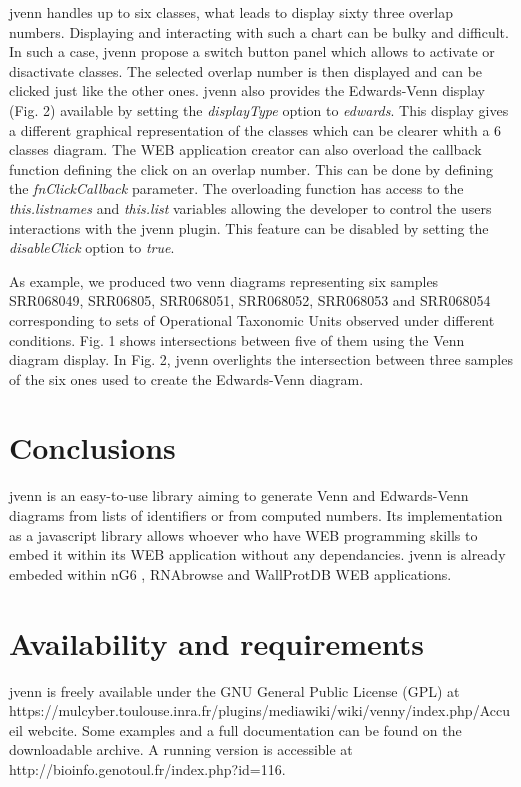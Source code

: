 \documentclass{bmcart}
\begin{document}
jvenn handles up to six classes, what leads to display sixty three overlap numbers. Displaying and interacting with such a chart
can be bulky and difficult. In such a case, jvenn propose a switch button panel which allows to activate or disactivate classes. 
The selected overlap number is then displayed and can be clicked just like the other ones. jvenn also provides the Edwards-Venn
display (Fig. 2) available by setting the \textit{displayType} option to \textit{edwards}. This display gives a different 
graphical representation of the classes which can be clearer whith a 6 classes diagram.
The WEB application creator can also overload the callback function defining the click on an overlap number. This can be done 
by defining the \textit{fnClickCallback} parameter. The overloading function has access to the \textit{this.listnames} and
\textit{this.list} variables allowing the developer to control the users interactions with the jvenn plugin. This feature can
be disabled by setting the \textit{disableClick} option to \textit{true}.

As example, we produced two venn diagrams representing six samples SRR068049, SRR06805, SRR068051, SRR068052, SRR068053 and 
SRR068054 corresponding to sets of Operational Taxonomic Units observed under different conditions. Fig. 1 shows intersections
between five of them using the Venn diagram display. In Fig. 2, jvenn overlights the intersection between three samples of the 
six ones used to create the Edwards-Venn diagram.


\section*{Conclusions}

jvenn is an easy-to-use library aiming to generate Venn and Edwards-Venn diagrams from lists of identifiers or from
computed numbers. Its implementation as a javascript library allows whoever who have WEB programming skills to embed 
it within its WEB application without any dependancies. jvenn is already embeded within nG6 \cite{Mariette2012}, 
RNAbrowse \cite{Mariette} and WallProtDB \cite{WallProtDB} WEB applications.

\section*{Availability and requirements}

jvenn is freely available under the GNU General Public License (GPL) at 
https://mulcyber.toulouse.inra.fr/plugins/mediawiki/wiki/venny/index.php/Accueil webcite. Some examples and a full documentation 
can be found on the downloadable archive. A running version is accessible at http://bioinfo.genotoul.fr/index.php?id=116.
\end{document}
